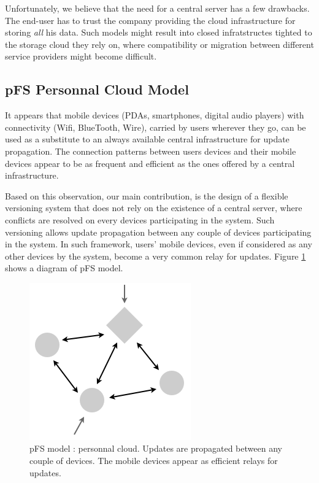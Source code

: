 Unfortunately, we believe that the need for a central server has a few
drawbacks. The end-user has to trust the company providing the cloud
infrastructure for storing \emph{all} his data. Such models might
result into closed infratstructes tighted to the storage cloud
they rely on, where compatibility or migration between different
service providers might become difficult.

\subsection {pFS Personnal Cloud Model}

It appears that mobile devices (PDAs, smartphones, digital audio
players) with connectivity (Wifi, BlueTooth, Wire), carried by users
wherever they go, can be used as a substitute to an always available
central infrastructure for update propagation. The connection patterns
between users devices and their mobile devices appear to be as
frequent and efficient as the ones offered by a central
infrastructure.

Based on this observation, our main contribution, is the design of a
flexible versioning system that does not rely on the existence of a
central server, where conflicts are resolved on every devices
participating in the system. Such versioning allows update propagation
between any couple of devices participating in the system. In such
framework, users' mobile devices, even if considered as any other
devices by the system, become a very common relay for updates. Figure
\ref{PfsModel} shows a diagram of pFS model.

\begin{figure}[ht]
\begin{center}
  \includegraphics [scale=0.4] {img/pfs_model}
  \caption{\label{PfsModel} {\small pFS model : personnal
      cloud. Updates are propagated between any couple of
      devices. The mobile devices appear as efficient relays 
      for updates.}}
\end{center}
\end{figure}


